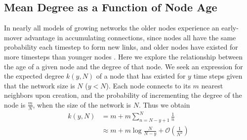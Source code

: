 \documentclass[aps,pre,reprint,superscriptaddress,amsmath,amssymb,nofootinbib]{revtex4-1}
\begin{document}

\subsection{Mean Degree as a Function of Node Age}
In nearly all models of growing networks the older nodes experience an early-mover advantage in accumulating connections, since nodes all have the same probability each timestep to form new links, and older nodes have existed for more timesteps than younger nodes \cite{reallyrandom}.
Here we explore the relationship between the age of a given node and the degree of that node. 
We seek an expression for the expected degree $k(y,N)$ of a node that has existed for $y$ time steps given that the network size is $N$ ($y < N$).
Each node connects to its $m$ nearest neighbors upon creation, and the probability of incrementing the degree of the node is $\frac{m}{N}$, when the size of the network is $N$.
Thus we obtain 
\begin{equation}\label{ageeq}
\begin{split}
k(y,N)& = m + m\sum_{n=N-y+1}^{N} \frac{1}{n}\\
      & \approx m + m \log \frac{N}{N-y} + \mathcal O\left(\frac{1}{N^2}\right)
\end{split}
\end{equation}
 
\end{document}
